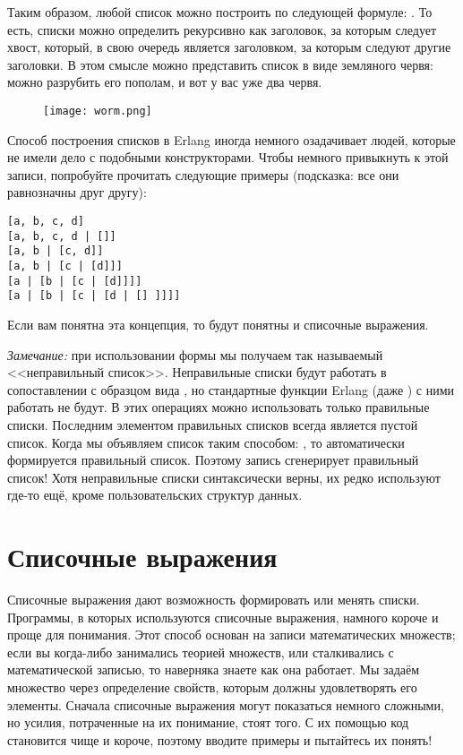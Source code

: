 Таким образом, любой список можно построить по следующей формуле: .
То есть, списки можно определить рекурсивно как заголовок, за которым следует хвост, который, в свою очередь является заголовком, за которым следуют другие заголовки.
В этом смысле можно представить список в виде земляного червя: можно разрубить его пополам, и вот у вас уже два червя.

\begin{figure}[h!]
    \centering
    \texttt{[image: worm.png]}
\end{figure} 

Способ построения списков в Erlang иногда немного озадачивает людей, которые не имели дело с подобными конструкторами.
Чтобы немного привыкнуть к этой записи, попробуйте прочитать следующие примеры (подсказка: все они равнозначны друг другу):\\ 
\begin{lstlisting}[style=repl]
[a, b, c, d]
[a, b, c, d | []]
[a, b | [c, d]]
[a, b | [c | [d]]]
[a | [b | [c | [d]]]]
[a | [b | [c | [d | [] ]]]]
\end{lstlisting}

Если вам понятна эта концепция, то будут понятны и списочные выражения.\\ 
\colorbox{lgray}
{
    \begin{minipage}{1.0\linewidth}
        \emph{Замечание:} при использовании формы \ops{[1 | 2]} мы получаем так называемый <<неправильный список>>.
        Неправильные списки будут работать в сопоставлении с образцом вида , но стандартные функции Erlang (даже ) с ними работать не будут.
        В этих операциях можно использовать только правильные списки.
        Последним элементом правильных списков всегда является пустой список.
        Когда мы объявляем список таким способом: \ops{[2]}, то автоматически формируется правильный список.
        Поэтому запись \ops{[1|[2]]} сгенерирует правильный список!
        Хотя неправильные списки синтаксически верны, их редко используют где\--то ещё, кроме пользовательских структур данных.
    \end{minipage}
}
\section{Списочные выражения}
\label{list-comprehensions}
Списочные выражения дают возможность формировать или менять списки.
Программы, в которых используются списочные выражения, намного короче и проще для понимания.
Этот способ основан на записи математических множеств; если вы когда\--либо занимались теорией множеств, или сталкивались с математической записью, то наверняка знаете как она работает.
Мы задаём множество через определение свойств, которым должны удовлетворять его элементы.
Сначала списочные выражения могут показаться немного сложными, но усилия, потраченные на их понимание, стоят того.
С их помощью код становится чище и короче, поэтому вводите примеры и пытайтесь их понять!

